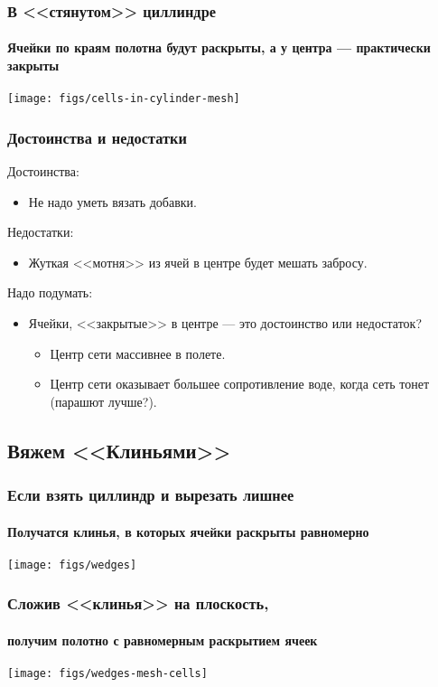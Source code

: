 \begin{frame}
    \frametitle{В <<стянутом>> циллиндре}
    \framesubtitle{Ячейки по краям полотна будут раскрыты, а у центра --- практически закрыты}

    \begin{center}
        \texttt{[image: figs/cells-in-cylinder-mesh]}
    \end{center}
\end{frame}

\begin{frame}
    \frametitle{Достоинства и недостатки}
	
	Достоинства:
    \begin{itemize}
        \item Не надо уметь вязать добавки.
    \end{itemize}
	
	Недостатки:
    \begin{itemize}
        \item Жуткая <<мотня>> из ячей в центре будет мешать забросу.
    \end{itemize}
	
	Надо подумать:
    \begin{itemize}
        \item Ячейки, <<закрытые>> в центре --- это достоинство или недостаток?
		\begin{itemize}
			\item Центр сети массивнее в полете.
			\item Центр сети оказывает большее сопротивление воде, когда сеть тонет (парашют лучше?).
		\end{itemize}		
    \end{itemize}
\end{frame}


\subsection{Вяжем <<Клиньями>>}

\begin{frame}
    \frametitle{Если взять циллиндр и вырезать лишнее}
    \framesubtitle{Получатся клинья, в которых ячейки раскрыты равномерно}

    \begin{center}
        \texttt{[image: figs/wedges]}
    \end{center}
\end{frame}

\begin{frame}
    \frametitle{Сложив <<клинья>> на плоскость,}
    \framesubtitle{получим полотно с равномерным раскрытием ячеек}

    \begin{center}
        \texttt{[image: figs/wedges-mesh-cells]}
    \end{center}
\end{frame}

